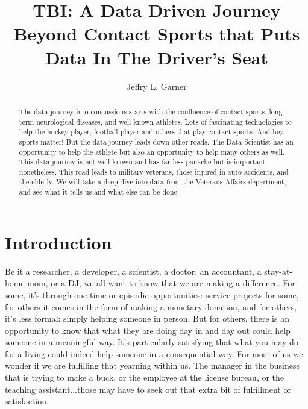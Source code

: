 \documentclass[sigconf]{acmart}
\begin{document}
\title{TBI: A Data Driven Journey Beyond Contact Sports that  
Puts Data In The Driver's Seat}



\author{Jeffry L. Garner}

\begin{abstract}

The data journey into concussions starts with the confluence of contact sports, long-term neurological diseases, and well known athletes.  Lots of fascinating technologies to help the hockey player, football player and others that play contact sports.  And hey, sports matter!  But the data journey leads down other roads.  The Data Scientist has an opportunity to help the athlete but also an opportunity to help many others as well.  This data journey is not well known and has far less panache but is important nonetheless.  This road leads to military veterans, those injured in auto-accidents, and the elderly.  We will take a deep dive into data from the Veterans Affairs department, and see what it tells us and what else can be done. 

\end{abstract}



\maketitle

\section{Introduction}

Be it a researcher, a developer, a scientist, a doctor, an accountant, a stay-at-home mom, or a DJ, we all want to know that we are making a difference.  For some, it's through one-time or episodic opportunities: service projects for some, for others it comes in the form of making a monetary donation, and for others, it's less formal: simply helping someone in person.  But for others, there is an opportunity to know that what they are doing day in and day out could help someone in a meaningful way.  It's particularly satisfying that what you may do for a living could indeed help someone in a consequential way.   For most of us we wonder if we are fulfilling that yearning within us.  The manager in the business that is trying to make a buck, or the employee at the license bureau, or the teaching assistant...those may have to seek out that extra bit of fulfillment or satisfaction.
\end{document}
